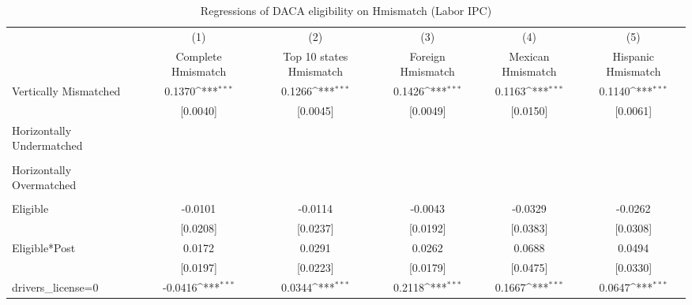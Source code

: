 \begin{table}[htbp]\centering
\def\sym#1{\ifmmode^{#1}\else\(^{#1}\)\fi}
\caption{Regressions of DACA eligibility on Hmismatch (Labor IPC)}
\begin{tabular}{l*{5}{c}}
\toprule
                    &\multicolumn{1}{c}{(1)}         &\multicolumn{1}{c}{(2)}         &\multicolumn{1}{c}{(3)}         &\multicolumn{1}{c}{(4)}         &\multicolumn{1}{c}{(5)}         \\
                    &Complete Hmismatch         &Top 10 states Hmismatch         &Foreign Hmismatch         &Mexican Hmismatch         &Hispanic Hmismatch         \\
\midrule
Vertically Mismatched&      0.1370\sym{***}&      0.1266\sym{***}&      0.1426\sym{***}&      0.1163\sym{***}&      0.1140\sym{***}\\
                    &    [0.0040]         &    [0.0045]         &    [0.0049]         &    [0.0150]         &    [0.0061]         \\
\addlinespace
Horizontally Undermatched&                     &                     &                     &                     &                     \\
                    &                     &                     &                     &                     &                     \\
\addlinespace
Horizontally Overmatched&                     &                     &                     &                     &                     \\
                    &                     &                     &                     &                     &                     \\
\addlinespace
Eligible            &     -0.0101         &     -0.0114         &     -0.0043         &     -0.0329         &     -0.0262         \\
                    &    [0.0208]         &    [0.0237]         &    [0.0192]         &    [0.0383]         &    [0.0308]         \\
\addlinespace
Eligible*Post       &      0.0172         &      0.0291         &      0.0262         &      0.0688         &      0.0494         \\
                    &    [0.0197]         &    [0.0223]         &    [0.0179]         &    [0.0475]         &    [0.0330]         \\
\addlinespace
drivers\_license=0   &     -0.0416\sym{***}&      0.0344\sym{***}&      0.2118\sym{***}&      0.1667\sym{***}&      0.0647\sym{***}\\

\end{tabular}
\end{table}
